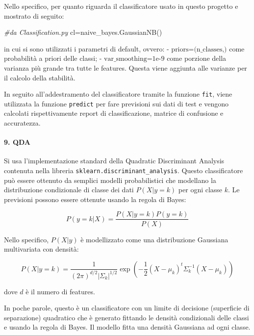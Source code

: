 \documentclass[11pt]{article}
\newenvironment{Shaded}{}{}
\newcommand{\CommentTok}[1]{\textcolor[rgb]{0.38,0.63,0.69}{\textit{{#1}}}}
\newcommand{\NormalTok}[1]{{#1}}
\newcommand{\OperatorTok}[1]{\textcolor[rgb]{0.40,0.40,0.40}{{#1}}}
\begin{document}
Nello specifico, per quanto riguarda il classificatore usato in questo
progetto e mostrato di seguito:

\begin{Shaded}
\begin{Highlighting}[]
\CommentTok{#da Classification.py}
\NormalTok{cl}\OperatorTok{=}\NormalTok{naive_bayes.GaussianNB()    }
\end{Highlighting}
\end{Shaded}

in cui si sono utilizzati i parametri di default, ovvero: -
\(\text{priors=(n_classes,)}\) come probabilità a priori delle classi; -
\(\text{var_smoothing=1e-9}\) come porzione della varianza più grande
tra tutte le features. Questa viene aggiunta alle varianze per il
calcolo della stabilità.

In seguito all'addestramento del classificatore tramite la funzione
\texttt{fit}, viene utilizzata la funzione \texttt{predict} per fare
previsioni sui dati di test e vengono calcolati rispettivamente report
di classificazione, matrice di confusione e accuratezza.

    \paragraph{9. QDA}\label{qda}

    Si usa l'implementazione standard della Quadratic Discriminant Analysis
contenuta nella libreria \texttt{sklearn.discriminant\_analysis}. Questo
classificatore può essere ottenuto da semplici modelli probabilistici
che modellano la distribuzione condizionale di classe dei dati
\(P(X|y=k)\) per ogni classe \(k\). Le previsioni possono essere
ottenute usando la regola di Bayes:

\begin{equation*}
P(y=k | X) = \frac{P(X | y=k) P(y=k)}{P(X)}
\end{equation*}

Nello specifico, \(P(X|y)\) è modellizzato come una distribuzione
Gaussiana multivariata con densità:

\begin{equation*}
P(X | y=k) = \frac{1}{(2\pi)^{d/2} |\Sigma_k|^{1/2}}\exp\left(-\frac{1}{2} (X-\mu_k)^t \Sigma_k^{-1} (X-\mu_k)\right)
\end{equation*}

dove \(d\) è il numero di features.

In poche parole, questo è un classificatore con un limite di decisione
(superficie di separazione) quadratico che è generato fittando le
densità condizionali delle classi e usando la regola di Bayes. Il
modello fitta una densità Gaussiana ad ogni classe.
\end{document}

